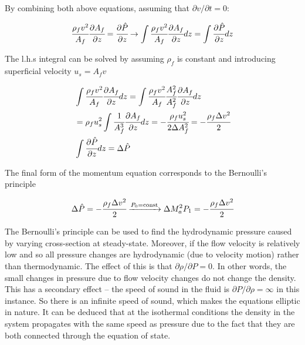 \documentclass[../Article_Model_Parameters.tex]{subfiles}
\begin{document}
	By combining both above equations, assuming that $\partial v / \partial t = 0$:
	
	{\footnotesize
		\begin{equation*}
			\cfrac{\rho_f v^2}{A_f} \cfrac{\partial A_f}{\partial z} = \cfrac{\partial \hat{P}}{\partial z} \rightarrow \int	\cfrac{\rho_f v^2}{A_f} \cfrac{\partial A_f}{\partial z} dz = \int \cfrac{\partial\hat{P}}{\partial z} dz
		\end{equation*}
	}
	
	The l.h.s integral can be solved by assuming $\rho_f$ is constant and introducing superficial velocity $u_s=A_f v$
	
	{\footnotesize
		\begin{align*}
			& \int	\cfrac{\rho_f v^2}{A_f} \cfrac{\partial A_f}{\partial z} dz = \int	\cfrac{\rho_f v^2}{A_f} \cfrac{A_f^2}{A_f^2} \cfrac{\partial A_f}{\partial z} dz \\
			&= \rho_f u_s^2  \int \cfrac{1}{A_f^3} \cfrac{\partial A_f}{\partial z} dz = - \cfrac{\rho_f u_s^2}{2 \Delta A_f^2} = - \cfrac{\rho_f \Delta v^2}{2} \\
			& \int \cfrac{\partial \hat{P}}{\partial z} dz = \Delta \hat{P}
		\end{align*}
	}
	
	The final form of the momentum equation corresponds to the Bernoulli's principle
	
	{\footnotesize
		\begin{equation*}
			\Delta \hat{P} = - \cfrac{\rho_f \Delta v^2}{2} \xrightarrow[]{P_0 = \text{const}} \Delta M_a^2 P_1 = - \cfrac{\rho_f \Delta v^2}{2}
		\end{equation*}
	}

	The Bernoulli's principle can be used to find the hydrodynamic pressure caused by varying cross-section at steady-state. Moreover, if the flow velocity is relatively low and so all pressure changes are hydrodynamic (due to velocity motion) rather than thermodynamic. The effect of this is that $\partial \rho / \partial P = 0$. In other words, the small changes in pressure due to flow velocity changes do not change the density. This has a secondary effect -- the speed of sound in the fluid is $\partial P/\partial \rho = \infty$	in this instance. So there is an infinite speed of sound, which makes the equations elliptic in nature. It can be deduced that at the isothermal conditions the density in the system propagates with the same speed as pressure due to the fact that they are both connected through the equation of state. 
	
	
	
	
	
	
	
	
	
	
\end{document}
